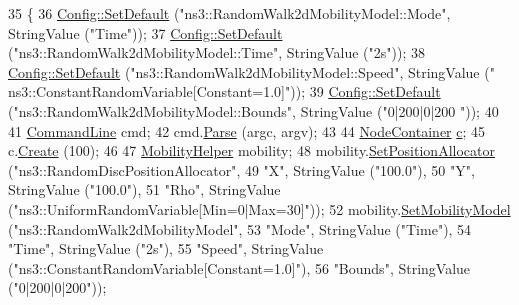 \begin{DoxyCode}
35 \{
36   \hyperlink{group__config_ga2e7882df849d8ba4aaad31c934c40c06}{Config::SetDefault} (\textcolor{stringliteral}{"ns3::RandomWalk2dMobilityModel::Mode"}, StringValue (\textcolor{stringliteral}{"Time"}));
37   \hyperlink{group__config_ga2e7882df849d8ba4aaad31c934c40c06}{Config::SetDefault} (\textcolor{stringliteral}{"ns3::RandomWalk2dMobilityModel::Time"}, StringValue (\textcolor{stringliteral}{"2s"}));
38   \hyperlink{group__config_ga2e7882df849d8ba4aaad31c934c40c06}{Config::SetDefault} (\textcolor{stringliteral}{"ns3::RandomWalk2dMobilityModel::Speed"}, StringValue (\textcolor{stringliteral}{"
      ns3::ConstantRandomVariable[Constant=1.0]"}));
39   \hyperlink{group__config_ga2e7882df849d8ba4aaad31c934c40c06}{Config::SetDefault} (\textcolor{stringliteral}{"ns3::RandomWalk2dMobilityModel::Bounds"}, StringValue (\textcolor{stringliteral}{"0|200|0|200
      "}));
40 
41   \hyperlink{classns3_1_1CommandLine}{CommandLine} cmd;
42   cmd.\hyperlink{classns3_1_1CommandLine_a5c10b85b3207e5ecb48d907966923156}{Parse} (argc, argv);
43 
44   \hyperlink{classns3_1_1NodeContainer}{NodeContainer} \hyperlink{lte_2model_2fading-traces_2fading__trace__generator_8m_ae0323a9039add2978bf5b49550572c7c}{c};
45   c.\hyperlink{classns3_1_1NodeContainer_a787f059e2813e8b951cc6914d11dfe69}{Create} (100);
46 
47   \hyperlink{classns3_1_1MobilityHelper}{MobilityHelper} mobility;
48   mobility.\hyperlink{classns3_1_1MobilityHelper_ac59d5295076be3cc11021566713a28c5}{SetPositionAllocator} (\textcolor{stringliteral}{"ns3::RandomDiscPositionAllocator"},
49                                  \textcolor{stringliteral}{"X"}, StringValue (\textcolor{stringliteral}{"100.0"}),
50                                  \textcolor{stringliteral}{"Y"}, StringValue (\textcolor{stringliteral}{"100.0"}),
51                                  \textcolor{stringliteral}{"Rho"}, StringValue (\textcolor{stringliteral}{"ns3::UniformRandomVariable[Min=0|Max=30]"}));
52   mobility.\hyperlink{classns3_1_1MobilityHelper_a030275011b6f40682e70534d30280aba}{SetMobilityModel} (\textcolor{stringliteral}{"ns3::RandomWalk2dMobilityModel"},
53                              \textcolor{stringliteral}{"Mode"}, StringValue (\textcolor{stringliteral}{"Time"}),
54                              \textcolor{stringliteral}{"Time"}, StringValue (\textcolor{stringliteral}{"2s"}),
55                              \textcolor{stringliteral}{"Speed"}, StringValue (\textcolor{stringliteral}{"ns3::ConstantRandomVariable[Constant=1.0]"}),
56                              \textcolor{stringliteral}{"Bounds"}, StringValue (\textcolor{stringliteral}{"0|200|0|200"}));

\end{DoxyCode}
